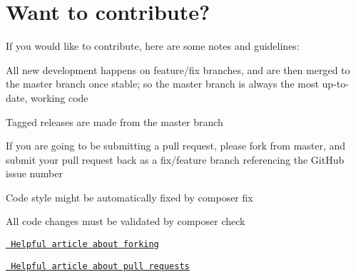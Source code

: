 \chapter{Want to contribute?}
\hypertarget{md__c_1_2_users_2gallo_2_one_drive_2_documents_2_s_a_x_c3_x_a9-casali_2www_2wp-content_2plugins_7a8e16678d01a713cd020b69a0d44167}{}\label{md__c_1_2_users_2gallo_2_one_drive_2_documents_2_s_a_x_c3_x_a9-casali_2www_2wp-content_2plugins_7a8e16678d01a713cd020b69a0d44167}
\label{md__c_1_2_users_2gallo_2_one_drive_2_documents_2_s_a_x_c3_x_a9-casali_2www_2wp-content_2plugins_7a8e16678d01a713cd020b69a0d44167_autotoc_md256}%
%


If you would like to contribute, here are some notes and guidelines\+:


\begin{DoxyItemize}
\item All new development happens on feature/fix branches, and are then merged to the {\ttfamily master} branch once stable; so the {\ttfamily master} branch is always the most up-\/to-\/date, working code
\item Tagged releases are made from the {\ttfamily master} branch
\item If you are going to be submitting a pull request, please fork from {\ttfamily master}, and submit your pull request back as a fix/feature branch referencing the Git\+Hub issue number
\item Code style might be automatically fixed by {\ttfamily composer fix}
\item All code changes must be validated by {\ttfamily composer check}
\item \href{https://help.github.com/articles/fork-a-repo/}{\texttt{ Helpful article about forking}}
\item \href{https://help.github.com/articles/using-pull-requests/}{\texttt{ Helpful article about pull requests}} 
\end{DoxyItemize}
